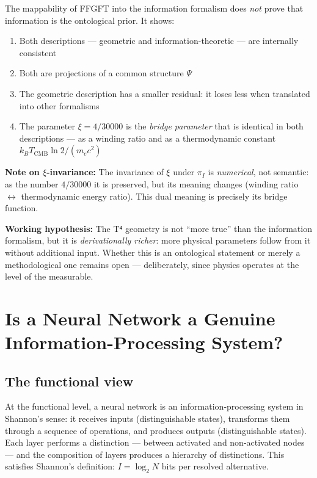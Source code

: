 The mappability of FFGFT into the information formalism does \emph{not}
prove that information is the ontological prior. It shows:

\begin{enumerate}
  \item Both descriptions --- geometric and information-theoretic ---
        are internally consistent
  \item Both are projections of a common structure $\Psi$
  \item The geometric description has a smaller residual:
        it loses less when translated into other formalisms
  \item The parameter $\xi = 4/30000$ is the \emph{bridge parameter}
        that is identical in both descriptions --- as a winding ratio
        and as a thermodynamic constant $k_B T_\text{CMB} \ln 2 / (m_e c^2)$
\end{enumerate}

\textbf{Note on $\xi$-invariance:} The invariance of $\xi$ under $\pi_I$
is \emph{numerical}, not semantic: as the number $4/30000$ it is preserved,
but its meaning changes (winding ratio $\leftrightarrow$ thermodynamic
energy ratio). This dual meaning is precisely its bridge function.

\textbf{Working hypothesis:} The T⁴ geometry is not ``more true'' than
the information formalism, but it is \emph{derivationally richer}:
more physical parameters follow from it without additional input.
Whether this is an ontological statement or merely a methodological one
remains open --- deliberately, since physics operates at the level of
the measurable.


\section{Is a Neural Network a Genuine Infor\-mation-Pro\-cessing System?}

\subsection{The functional view}

At the functional level, a neural network is an information-processing
system in Shannon's sense: it receives inputs (distinguishable states),
transforms them through a sequence of operations, and produces outputs
(distinguishable states). Each layer performs a distinction --- between
activated and non-activated nodes --- and the composition of layers
produces a hierarchy of distinctions. This satisfies Shannon's
definition: $I = \log_2 N$ bits per resolved alternative.

